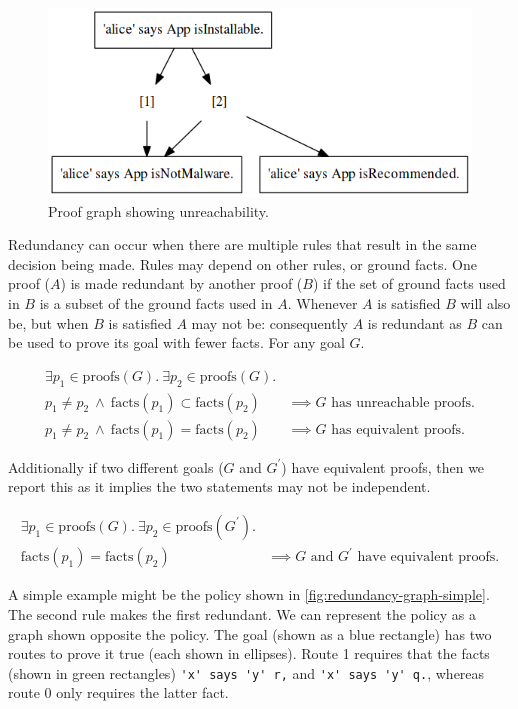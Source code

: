 \documentclass[thesis.tex]{subfiles}
\begin{document}
\begin{figure}
  \centering
  \includegraphics[width=0.5\linewidth]{./figures/unreachability.png}
  \caption{Proof graph showing unreachability.}
  \label{fig:unreachability}
\end{figure}

Redundancy can occur when there are multiple rules that result in the
same decision being made.  Rules may depend on other rules, or ground
facts.  One proof ($A$) is made redundant by another proof ($B$) if
the set of ground facts used in $B$ is a subset of the ground facts
used in $A$. Whenever $A$ is satisfied $B$ will also be, but when $B$
is satisfied $A$ may not be: consequently $A$ is redundant as $B$ can
be used to prove its goal with fewer facts.  For any goal
$G$.

\begin{align*}
  \exists p_1 \in \text{proofs}(G).~\exists p_2 \in \text{proofs}(G).        & \\
  p_1 \not= p_2~\wedge~\text{facts}(p_1) \subset \text{facts}(p_2)           & \implies G\text{ has unreachable proofs.} \\
  p_1 \not= p_2~\wedge~\text{facts}(p_1) = \text{facts}(p_2)                 & \implies G\text{ has equivalent proofs.}
\end{align*}

Additionally if two different goals ($G$ and $G^\prime$) have
equivalent proofs, then we report this as it implies the two
statements may not be independent.

\begin{align*}
  \exists p_1 \in \text{proofs}(G).~\exists p_2 \in \text{proofs}(G^\prime). & \\
  \text{facts}(p_1) = \text{facts}(p_2)                                      & \implies \text{$G$ and $G^\prime$ have equivalent proofs.}
\end{align*}

A simple example might be the policy shown in \autoref{fig:redundancy-graph-simple}.
The second rule makes the first redundant.  We can represent the policy
as a graph shown opposite the policy.  The goal (shown as a blue rectangle) has two routes
to prove it true (each shown in ellipses).  Route 1 requires that the facts
(shown in green rectangles) \lstinline!'x' says 'y' r,! and
\lstinline!'x' says 'y' q.!, whereas route 0 only requires the
latter fact.
\end{document}
